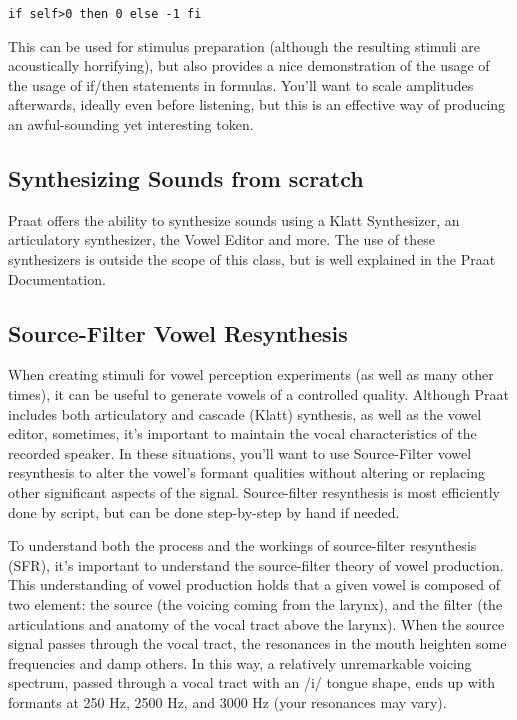 \texttt{if self>0 then 0 else -1 fi}

This can be used for stimulus preparation (although the resulting
stimuli are acoustically horrifying), but also provides a nice
demonstration of the usage of the usage of if/then statements in
formulas. You'll want to scale amplitudes afterwards, ideally even
before listening, but this is an effective way of producing an
awful-sounding yet interesting token.

\hypertarget{synthesizing-sounds-from-scratch}{%
\subsection{Synthesizing Sounds from
scratch}\label{synthesizing-sounds-from-scratch}}

Praat offers the ability to synthesize sounds using a Klatt Synthesizer,
an articulatory synthesizer, the Vowel Editor and more. The use of these
synthesizers is outside the scope of this class, but is well explained
in the Praat Documentation.

\hypertarget{source-filter-vowel-resynthesis}{%
\subsection{Source-Filter Vowel
Resynthesis}\label{source-filter-vowel-resynthesis}}

When creating stimuli for vowel perception experiments (as well as many
other times), it can be useful to generate vowels of a controlled
quality. Although Praat includes both articulatory and cascade (Klatt)
synthesis, as well as the vowel editor, sometimes, it's important to
maintain the vocal characteristics of the recorded speaker. In these
situations, you'll want to use Source-Filter vowel resynthesis to alter
the vowel's formant qualities without altering or replacing other
significant aspects of the signal. Source-filter resynthesis is most
efficiently done by script, but can be done step-by-step by hand if
needed.

To understand both the process and the workings of source-filter
resynthesis (SFR), it's important to understand the source-filter theory
of vowel production. This understanding of vowel production holds that a
given vowel is composed of two element: the source (the voicing coming
from the larynx), and the filter (the articulations and anatomy of the
vocal tract above the larynx). When the source signal passes through the
vocal tract, the resonances in the mouth heighten some frequencies and
damp others. In this way, a relatively unremarkable voicing spectrum,
passed through a vocal tract with an /i/ tongue shape, ends up with
formants at 250 Hz, 2500 Hz, and 3000 Hz (your resonances may vary).

